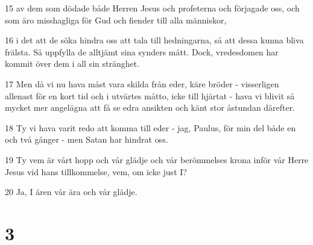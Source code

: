 \par 15 av dem som dödade både Herren Jesus och profeterna och förjagade oss, och som äro misshagliga för Gud och fiender till alla människor,
\par 16 i det att de söka hindra oss att tala till hedningarna, så att dessa kunna bliva frälsta. Så uppfylla de alltjämt sina synders mått. Dock, vredesdomen har kommit över dem i all sin stränghet.
\par 17 Men då vi nu hava måst vara skilda från eder, käre bröder - visserligen allenast för en kort tid och i utvärtes måtto, icke till hjärtat - hava vi blivit så mycket mer angelägna att få se edra ansikten och känt stor åstundan därefter.
\par 18 Ty vi hava varit redo att komma till eder - jag, Paulus, för min del både en och två gånger - men Satan har hindrat oss.
\par 19 Ty vem är vårt hopp och vår glädje och vår berömmelses krona inför vår Herre Jesus vid hans tillkommelse, vem, om icke just I?
\par 20 Ja, I ären vår ära och vår glädje.

\chapter{3}


